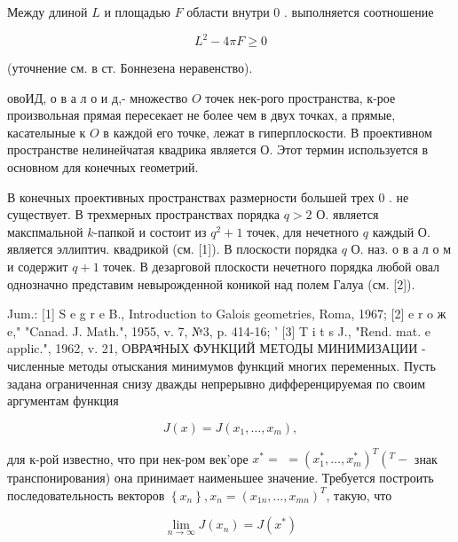 \documentclass[10pt]{article}
\begin{document}
Между длиной $L$ и площадью $F$ области внутри 0 . выполняется соотношение



\[

L^{2}-4 \pi F \geqslant 0

\]



(уточнение см. в ст. Боннезена неравенство).



овоИД, о в а л о и д,- множество $O$ точек нек-рого пространства, к-рое произвольная прямая пересекает не более чем в двух точках, а прямые, касателыные к $O$ в каждой его точке, лежат в гиперплоскости. В проективном пространстве нелинейчатая квадрика является О. Этот термин используется в основном для конечных геометрий.



В конечных проективных пространствах размерности большей трех 0 . не существует. В трехмерных пространствах порядка $q>2$ О. является макспмальной $k$-папкой и состоит из $q^{2}+1$ точек, для нечетного $q$ каждый О. является эллиптич. квадрикой (см. [1]). В плоскости порядка $q$ О. наз. о в а л о м и содержит $q+1$ точек. В дезарговой плоскости нечетного порядка любой овал однозначно представим невырожденной коникой над полем Галуа (см. [2]).



Jum.: [1] S e g r e B., Introduction to Galois geometries, Roma, 1967; [2] e r o ж e," "Canad. J. Math.", 1955, v. 7, №3, p. 414-16; ' [3] T i t s J., "Rend. mat. e applic.", 1962, v. 21, ОВРАभНЫХ ФУНКЦИЙ МЕТОДЫ МИНИМИЗАЦИИ - численные методы отыскания минимумов функций многих переменных. Пусть задана ограниченная снизу дважды непрерывно дифференцируемая по своим аргументам функция



\[

J(x)=J\left(x_{1}, \ldots, x_{m}\right),

\]



для к-рой известно, что при нек-ром век'оре $x^{*}=$ $=\left(x_{1}^{*}, \ldots, x_{m}^{*}\right)^{T}\left({ }^{T}-\right.$ знак транспонирования) она принимает наименьшее значение. Требуется построить последовательность векторов $\left\{x_{n}\right\}, x_{n}=\left(x_{1 n}, \ldots, x_{m n}\right)^{T}$, такую, что



\[

\lim _{n \rightarrow \infty} J\left(x_{n}\right)=J\left(x^{*}\right)

\]
\end{document}
